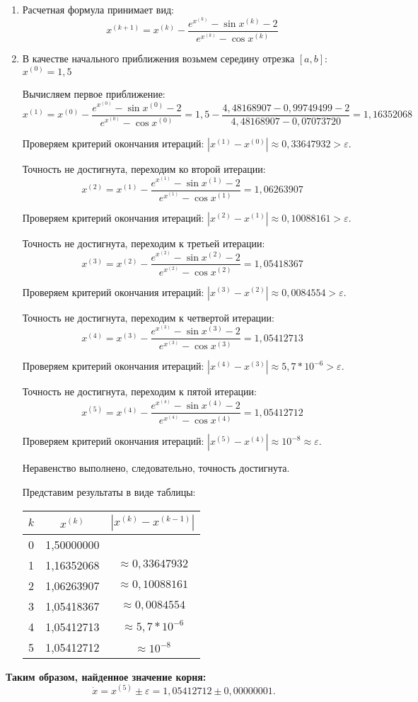 \documentclass[a4paper,12pt]{article} %
\begin{document}
\begin{enumerate}

\item Расчетная формула принимает вид:
$$x^{(k + 1)} = x^{(k)} - \frac{e^{x^{(k)}} - \sin x^{(k)} - 2}{e^{x^{(k)}} - \cos x^{(k)}}$$

\item В качестве начального приближения возьмем середину отрезка $[a, b]$: $x^{(0)} = 1,5$

Вычисляем первое приближение:
$$x^{(1)} = x^{(0)} - \frac{e^{x^{(0)}} - \sin x^{(0)} - 2}{e^{x^{(0)}} - \cos x^{(0)}} = 1,5 - \frac{4,48168907 - 0,99749499 - 2}{4,48168907 - 0,07073720} = 1,16352068$$

Проверяем критерий окончания итераций: $|x^{(1)} - x^{(0)}| \approx 0,33647932 > \varepsilon$.

Точность не достигнута, переходим ко второй итерации:
$$x^{(2)} = x^{(1)} - \frac{e^{x^{(1)}} - \sin x^{(1)} - 2}{e^{x^{(1)}} - \cos x^{(1)}} = 1,06263907$$

Проверяем критерий окончания итераций: $|x^{(2)} - x^{(1)}| \approx 0,10088161 > \varepsilon$.

Точность не достигнута, переходим к третьей итерации:
$$x^{(3)} = x^{(2)} - \frac{e^{x^{(2)}} - \sin x^{(2)} - 2}{e^{x^{(2)}} - \cos x^{(2)}} = 1,05418367$$

Проверяем критерий окончания итераций: $|x^{(3)} - x^{(2)}| \approx 0,0084554 > \varepsilon$.

\newpage

Точность не достигнута, переходим к четвертой итерации:
$$x^{(4)} = x^{(3)} - \frac{e^{x^{(3)}} - \sin x^{(3)} - 2}{e^{x^{(3)}} - \cos x^{(3)}} = 1,05412713$$

Проверяем критерий окончания итераций: $|x^{(4)} - x^{(3)}| \approx 5,7 * 10^{-6} > \varepsilon$.

Точность не достигнута, переходим к пятой итерации:
$$x^{(5)} = x^{(4)} - \frac{e^{x^{(4)}} - \sin x^{(4)} - 2}{e^{x^{(4)}} - \cos x^{(4)}} = 1,05412712$$

Проверяем критерий окончания итераций: $|x^{(5)} - x^{(4)}| \approx 10^{-8} \approx \varepsilon$.

Неравенство выполнено, следовательно, точность достигнута.

Представим результаты в виде таблицы:

\begin{center}
\begin{tabular}{ | c | c | c  | }
\hline
$k$ & $x^{(k)}$ & $|x^{(k)} - x^{(k - 1)}|$\\ \hline 
0 & 1,50000000 & \\
1 & 1,16352068 & $\approx 0,33647932$ \\
2 & 1,06263907 & $\approx 0,10088161$ \\
3 & 1,05418367 & $\approx 0,0084554$ \\
4 & 1,05412713 & $\approx 5,7 * 10^{-6}$ \\
5 & 1,05412712 & $\approx 10^{-8}$ \\
\hline
\end{tabular}
\end{center}
\vspace{0.5cm}

\end{enumerate}
\begin{center}
\Large \textbf{Таким образом, найденное значение корня:} $$\dot x = x^{(5)} \pm \varepsilon = 1,05412712 \pm 0,00000001.$$
\end{center}
\end{document}

